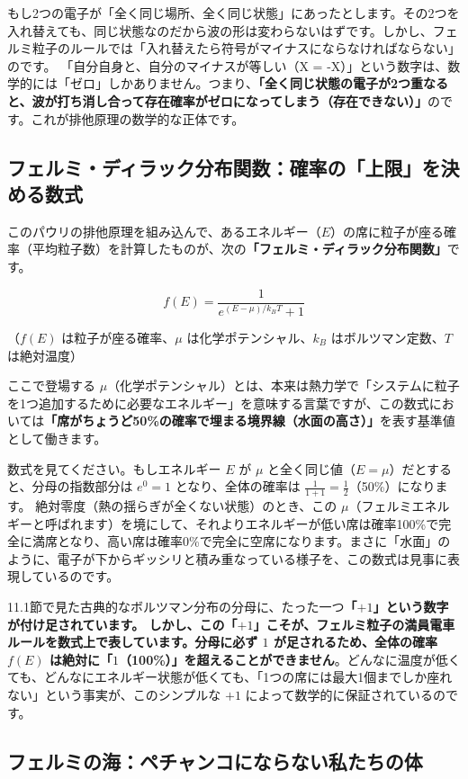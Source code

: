 もし2つの電子が「全く同じ場所、全く同じ状態」にあったとします。その2つを入れ替えても、同じ状態なのだから波の形は変わらないはずです。しかし、フェルミ粒子のルールでは「入れ替えたら符号がマイナスにならなければならない」のです。 「自分自身と、自分のマイナスが等しい（X = -X）」という数字は、数学的には「ゼロ」しかありません。つまり、\textbf{「全く同じ状態の電子が2つ重なると、波が打ち消し合って存在確率がゼロになってしまう（存在できない）」}のです。これが排他原理の数学的な正体です。

\subsection{フェルミ・ディラック分布関数：確率の「上限」を決める数式}

このパウリの排他原理を組み込んで、あるエネルギー（\(E\)）の席に粒子が座る確率（平均粒子数）を計算したものが、次の\textbf{「フェルミ・ディラック分布関数」}です。

\[
f(E) = \frac{1}{e^{(E-\mu)/k_B T}+1}
\]

（\(f(E)\) は粒子が座る確率、\(\mu\) は化学ポテンシャル、\(k_B\) はボルツマン定数、\(T\) は絶対温度）

ここで登場する \(\mu\)（化学ポテンシャル）とは、本来は熱力学で「システムに粒子を1つ追加するために必要なエネルギー」を意味する言葉ですが、この数式においては\textbf{「席がちょうど50\%の確率で埋まる境界線（水面の高さ）」}を表す基準値として働きます。

数式を見てください。もしエネルギー \(E\) が \(\mu\) と全く同じ値（\(E = \mu\)）だとすると、分母の指数部分は \(e^{0} = 1\) となり、全体の確率は \(\frac{1}{1+1} = \frac{1}{2}\)（50\%）になります。 絶対零度（熱の揺らぎが全くない状態）のとき、この \(\mu\)（フェルミエネルギーと呼ばれます）を境にして、それよりエネルギーが低い席は確率100\%で完全に満席となり、高い席は確率0\%で完全に空席になります。まさに「水面」のように、電子が下からギッシリと積み重なっている様子を、この数式は見事に表現しているのです。

11.1節で見た古典的なボルツマン分布の分母に、たった一つ\textbf{「\(+1\)」という数字が付け足されています。 しかし、この「\(+1\)」こそが、フェルミ粒子の満員電車ルールを数式上で表しています。分母に必ず \(1\) が足されるため、全体の確率 \(f(E)\) は絶対に「\(1\)（100\%）」を超えることができません}。どんなに温度が低くても、どんなにエネルギー状態が低くても、「1つの席には最大1個までしか座れない」という事実が、このシンプルな \(+1\) によって数学的に保証されているのです。

\subsection{フェルミの海：ペチャンコにならない私たちの体}

